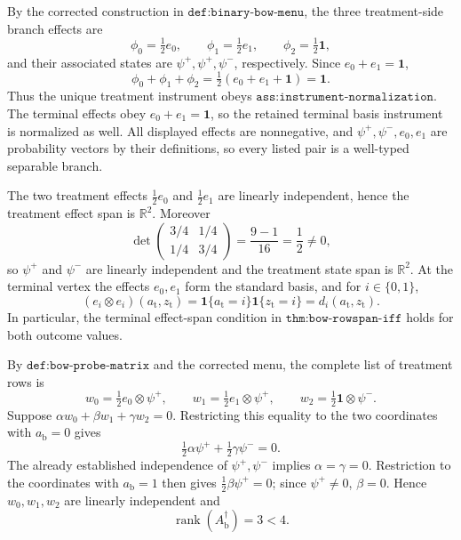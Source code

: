 By the corrected construction in \(\texttt{def:binary-bow-menu}\), the three treatment-side branch effects are
\[
 \phi_0=\tfrac12 e_0,\qquad
 \phi_1=\tfrac12 e_1,\qquad
 \phi_2=\tfrac12\mathbf 1,
\]
and their associated states are \(\psi^{+},\psi^{+},\psi^{-}\), respectively.  Since \(e_0+e_1=\mathbf 1\),
\[
 \phi_0+\phi_1+\phi_2
 =\tfrac12(e_0+e_1+\mathbf 1)
 =\mathbf 1.
\]
Thus the unique treatment instrument obeys \(\texttt{ass:instrument-normalization}\).  The terminal effects obey \(e_0+e_1=\mathbf 1\), so the retained terminal basis instrument is normalized as well.  All displayed effects are nonnegative, and \(\psi^{+},\psi^{-},e_0,e_1\) are probability vectors by their definitions, so every listed pair is a well-typed separable branch.

The two treatment effects \(\tfrac12e_0\) and \(\tfrac12e_1\) are linearly independent, hence the treatment effect span is \(\mathbb R^2\).  Moreover
\[
 \det\!\begin{pmatrix}3/4&1/4\\[2pt]1/4&3/4\end{pmatrix}
 =\frac{9-1}{16}=\frac12\ne0,
\]
so \(\psi^{+}\) and \(\psi^{-}\) are linearly independent and the treatment state span is \(\mathbb R^2\).  At the terminal vertex the effects \(e_0,e_1\) form the standard basis, and for \(i\in\{0,1\}\),
\[
 (e_i\otimes e_i)(a_{\mathrm t},z_{\mathrm t})
 =\mathbf 1\{a_{\mathrm t}=i\}\mathbf 1\{z_{\mathrm t}=i\}
 =d_i(a_{\mathrm t},z_{\mathrm t}).
\]
In particular, the terminal effect-span condition in \(\texttt{thm:bow-rowspan-iff}\) holds for both outcome values.

By \(\texttt{def:bow-probe-matrix}\) and the corrected menu, the complete list of treatment rows is
\[
 w_0=\tfrac12e_0\otimes\psi^{+},\qquad
 w_1=\tfrac12e_1\otimes\psi^{+},\qquad
 w_2=\tfrac12\mathbf 1\otimes\psi^{-}.
\]
Suppose \(\alpha w_0+\beta w_1+\gamma w_2=0\).  Restricting this equality to the two coordinates with \(a_{\mathrm b}=0\) gives
\[
 \tfrac12\alpha\psi^{+}+\tfrac12\gamma\psi^{-}=0.
\]
The already established independence of \(\psi^{+},\psi^{-}\) implies \(\alpha=\gamma=0\).  Restriction to the coordinates with \(a_{\mathrm b}=1\) then gives \(\tfrac12\beta\psi^{+}=0\); since \(\psi^{+}\ne0\), \(\beta=0\).  Hence \(w_0,w_1,w_2\) are linearly independent and
\[
 \operatorname{rank}(A_{\mathrm b}^{\dagger})=3<4.
\]

